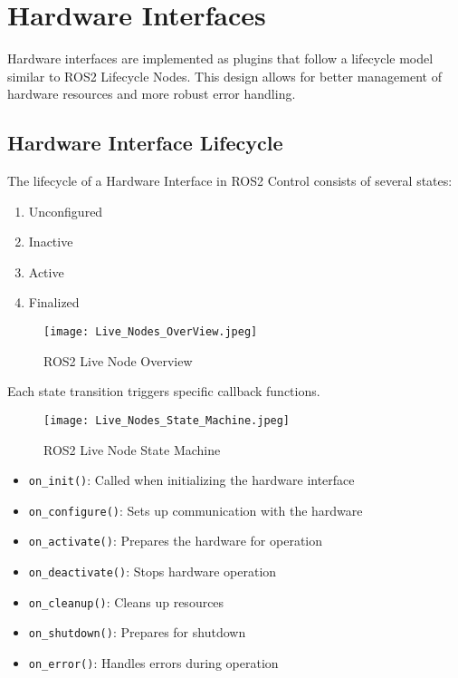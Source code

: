 \section{Hardware Interfaces}

Hardware interfaces are implemented as plugins that follow a 
lifecycle model similar to ROS2 Lifecycle Nodes. 
This design allows for better management of hardware 
resources and more robust error handling.


\subsection{Hardware Interface Lifecycle}

The lifecycle of a Hardware Interface in ROS2 Control consists of several states:

\begin{enumerate}
    \item Unconfigured
    \item Inactive
    \item Active
    \item Finalized
\end{enumerate}


\begin{figure}[ht]
    \centering
    \texttt{[image: Live\_Nodes\_OverView.jpeg]}
    \caption{ROS2 Live Node Overview}
    \label{fig:mesh4}
\end{figure}

Each state transition triggers specific callback functions.

\begin{figure}[ht]
    \centering
    \texttt{[image: Live\_Nodes\_State\_Machine.jpeg]}
    \caption{ROS2 Live Node State Machine}
    \label{fig:mesh5}
\end{figure}

\begin{itemize}
    \item \texttt{on\_init()}: Called when initializing the hardware interface
    \item \texttt{on\_configure()}: Sets up communication with the hardware
    \item \texttt{on\_activate()}: Prepares the hardware for operation
    \item \texttt{on\_deactivate()}: Stops hardware operation
    \item \texttt{on\_cleanup()}: Cleans up resources
    \item \texttt{on\_shutdown()}: Prepares for shutdown
    \item \texttt{on\_error()}: Handles errors during operation
\end{itemize}

